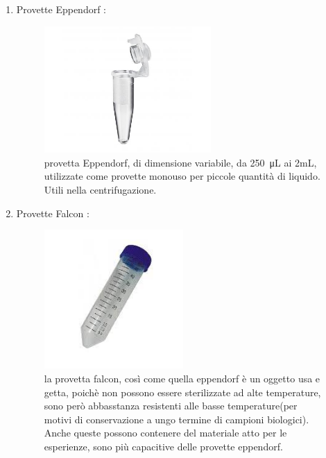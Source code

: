 \documentclass{article}
\begin{document}
\begin{enumerate}
\begin{figure}[H]
		\end{figure}

		\vspace{0.5cm}


		\item Provette Eppendorf :

		\begin{figure}[H]

			\includegraphics[width=0.6\textwidth]{./immagini/eppendorf.jpg}
			\caption{provetta Eppendorf, di dimensione variabile, da \SI{250}{\micro\liter} ai 2mL,
			utilizzate come provette monouso per piccole quantità di liquido. Utili nella centrifugazione.}
			\label{eppendorf}

		\end{figure}

		\vspace{0.5cm}


		\item Provette Falcon :

		\begin{figure}[H]

			\includegraphics[width=0.5\textwidth]{./immagini/falcon.jpeg}
			\caption{la provetta falcon, così come quella eppendorf è un oggetto usa e getta, poichè non possono essere sterilizzate ad alte temperature,
			sono però abbasstanza resistenti alle basse temperature(per motivi di conservazione a ungo termine di campioni biologici). Anche queste
			possono contenere del materiale atto per le esperienze, sono più capacitive delle provette eppendorf.}
			\label{falcon}


\end{figure}
\end{enumerate}
\end{document}
